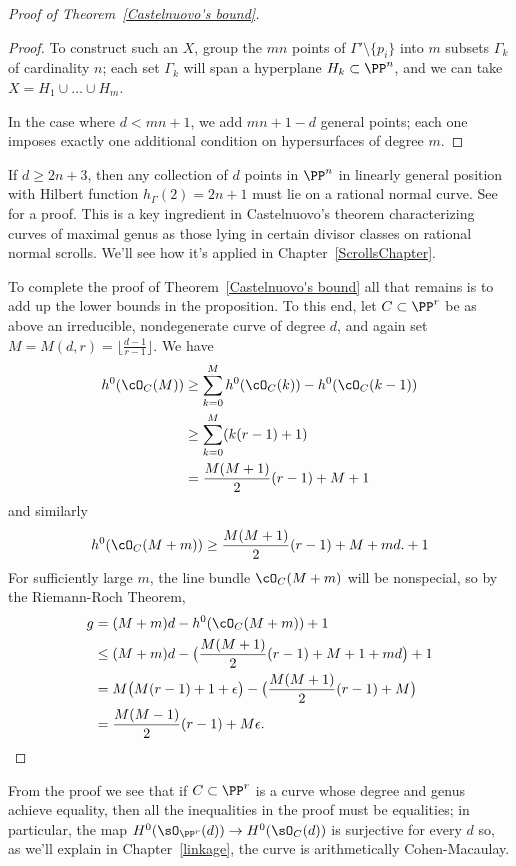 \begin{proof}[Proof of Theorem~\ref{Castelnuovo's bound}]
\begin{proof}
To construct such an $X$, group the $mn$ points of $\Gamma' \setminus \{p_i\}$ into $m$ subsets $\Gamma_k$ of cardinality $n$; each set $\Gamma_k$ will span a hyperplane $H_k \subset \PP^n$, and we can take $X = H_1 \cup \dots \cup H_m$. 

In the case where $d<mn+1$, we add $mn+1-d$ general points; each one imposes exactly one
additional condition on hypersurfaces of degree $m$.
\end{proof}

\begin{fact}
If $d \geq 2n+3$, then any collection of $d$ points in $\PP^n$ in linearly general position with Hilbert function $h_\Gamma(2) = 2n+1$ must lie on a rational normal curve. See~\cite[Lemma 3.9]{MR685427} for a proof.
 This is a key ingredient in Castelnuovo's theorem characterizing curves of maximal genus as
those lying in certain divisor classes on rational normal scrolls.
We'll see how it's applied in Chapter~\ref{ScrollsChapter}.
\end{fact}


To complete the proof of Theorem~\ref{Castelnuovo's bound} all that remains is to add up the lower bounds in the proposition. To this end, let $C \subset \PP^r$ be as above an irreducible, nondegenerate curve of degree $d$, and again set 
$M = M(d,r) = \lfloor{\frac{d-1}{r-1}}\rfloor$.
We have 
\begin{align*}
h^0(\cO_C(M)) &\geq \sum_{k=0}^M h^0(\cO_C(k)) - h^0(\cO_C(k-1)) \\
&\geq  \sum_{k=0}^M (k(r-1)+1) \\
&= \frac{M(M+1)}{2}(r-1) + M + 1
\end{align*}
and similarly
$$
h^0(\cO_C(M+m)) \geq \frac{M(M+1)}{2}(r-1) + M  + md.+ 1
$$
For sufficiently large $m$, the line bundle $\cO_C(M+m)$ will be nonspecial, so by the Riemann-Roch Theorem,
\begin{align*}
g &= (M+m)d - h^0(\cO_C(M+m)) + 1 \\
&\leq (M+m)d - \bigl(  \frac{M(M+1)}{2}(r-1) + M + 1 + md \bigr)+1 \\
& = M\bigl( M(r-1) + 1 + \epsilon \bigr) - \bigl(  \frac{M(M+1)}{2}(r-1) + M  \bigr) \\
&= \frac{M(M-1)}{2}(r-1) + M\epsilon.
\end{align*}
 \end{proof}

From the proof we see that if  $C\subset \PP^r$ is a curve whose degree and genus achieve equality, then all the inequalities in the proof
must be equalities; in particular, the map $H^0(\sO_{\PP^r}(d)) \to H^0(\sO_C(d))$ is surjective for every $d$ so, as we'll explain
in Chapter~\ref{linkage}, the curve is arithmetically Cohen-Macaulay.



